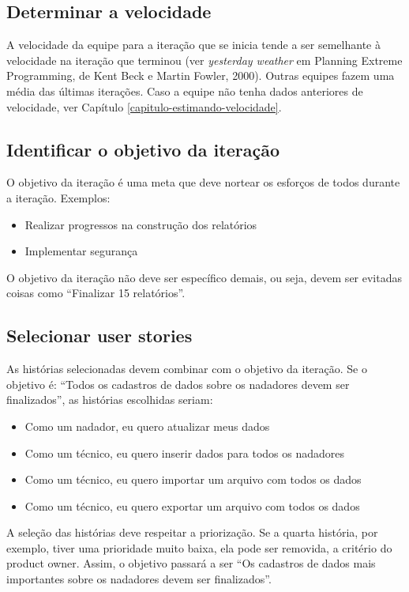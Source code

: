 \documentclass[a4paper,abntfigtabnum,noindentfirst]{abnt}
\begin{document}
\subsection{Determinar a velocidade}

A velocidade da equipe para a iteração que se inicia tende a ser semelhante à velocidade na iteração que terminou (ver \textit{yesterday weather} em Planning Extreme Programming, de Kent Beck e Martin Fowler, 2000). Outras equipes fazem uma média das últimas iterações. Caso a equipe não tenha dados anteriores de velocidade, ver Capítulo \ref{capitulo-estimando-velocidade}.


\subsection{Identificar o objetivo da iteração}

O objetivo da iteração é uma meta que deve nortear os esforços de todos durante a iteração. Exemplos:
\begin{itemize}
 \item Realizar progressos na construção dos relatórios
 \item Implementar segurança
\end{itemize}

O objetivo da iteração não deve ser específico demais, ou seja, devem ser evitadas coisas como ``Finalizar 15 relatórios''.


\subsection{Selecionar user stories}

As histórias selecionadas devem combinar com o objetivo da iteração. Se o objetivo é: ``Todos os cadastros de dados sobre os nadadores devem ser finalizados'', as histórias escolhidas seriam:
\begin{itemize}
 \item Como um nadador, eu quero atualizar meus dados
 \item Como um técnico, eu quero inserir dados para todos os nadadores
 \item Como um técnico, eu quero importar um arquivo com todos os dados
 \item Como um técnico, eu quero exportar um arquivo com todos os dados
\end{itemize}
A seleção das histórias deve respeitar a priorização. Se a quarta história, por exemplo, tiver uma prioridade muito baixa, ela pode ser removida, a critério do product owner. Assim, o objetivo passará a ser ``Os cadastros de dados mais importantes sobre os nadadores devem ser finalizados''.
\end{document}
